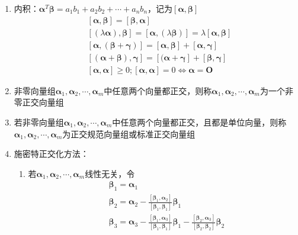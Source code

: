 \documentclass[12pt]{book}
\begin{document}
\begin{enumerate}[1.]
    \item 内积：$\bm{\alpha}^T\bm{\beta}=a_1 b_1 +a_2 b_2+\cdots+a_n b_n$，记为$[\bm{\alpha},\bm{\beta}]$
          \begin{align*}
               & [\bm{\alpha},\bm{\beta}] = [\bm{\beta},\bm{\alpha}]                                                      \\
               & [(\lambda \bm{\alpha}),\bm{\beta}] = [\bm{\alpha},(\lambda\bm{\beta})] = \lambda[\bm{\alpha},\bm{\beta}] \\
               & [\bm{\alpha},(\bm{\beta}+\bm{\gamma})] = [\bm{\alpha},\bm{\beta}]+[\bm{\alpha},\bm{\gamma}]              \\
               & [(\bm{\alpha}+\bm{\beta}),\bm{\gamma}] = [(\bm{\alpha}+\bm{\gamma}]+[\bm{\beta},\bm{\gamma}]             \\
               & [\bm{\alpha},\bm{\alpha}]\geqslant 0; [\bm{\alpha},\bm{\alpha}]=0\Leftrightarrow \bm{\alpha}=\bm{O}
          \end{align*}
    \item 非零向量组$\bm{\alpha}_1,\bm{\alpha}_2,\cdots,\bm{\alpha}_m$中任意两个向量都正交，则称$\bm{\alpha}_1,\bm{\alpha}_2,\cdots,\bm{\alpha}_m$为一个非零正交向量组
    \item 若非零向量组$\bm{\alpha}_1,\bm{\alpha}_2,\cdots,\bm{\alpha}_{m}$中任意两个向量都正交，且都是单位向量，则称$\bm{\alpha}_{1},\bm{\alpha}_{2},\cdots,\bm{\alpha}_{m}$为正交规范向量组或标准正交向量组
    \item 施密特正交化方法：
          \begin{enumerate}[(1)]
              \item 若$\bm{\alpha}_{1},\bm{\alpha}_{2},\cdots,\bm{\alpha}_{m}$线性无关，令
                    \begin{align*}
                        &\bm{\beta}_1 = \bm{\alpha}_1                                                                                                                                                                        \\
                        &\bm{\beta}_2 = \bm{\alpha}_2 - \frac{[\bm{\beta}_{1},\bm{\alpha}_2]}{[\bm{\beta}_1,\bm{\beta}_1]}\bm{\beta}_{1}                                                                                     \\
                        &\bm{\beta}_3 = \bm{\alpha}_3 - \frac{[\bm{\beta}_{1},\bm{\alpha}_3]}{[\bm{\beta}_1,\bm{\beta}_1]}\bm{\beta}_{1} -  \frac{[\bm{\beta}_{2},\bm{\alpha}_3]}{[\bm{\beta}_2,\bm{\beta}_2]}\bm{\beta}_{2} \\

\end{align*}
\end{enumerate}
\end{enumerate}
\end{document}
